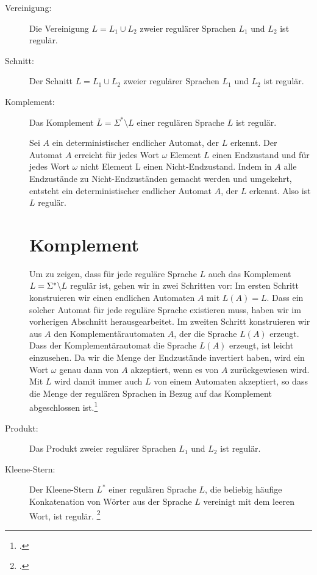 \documentclass{lehramt-informatik-haupt}
\begin{document}
\begin{description}
\item[Vereinigung:]

Die Vereinigung $L = L_1 \cup L_2$ zweier regulärer Sprachen $L_1$ und
$L_2$ ist regulär.

\item[Schnitt:]

Der Schnitt $L = L_1 \cup L_2$ zweier regulärer Sprachen $L_1$ und $L_2$
ist regulär.

\item[Komplement:]

Das Komplement $\bar L = \Sigma^* \setminus L$ einer regulären Sprache
$L$ ist regulär.

Sei $A$ ein deterministischer endlicher Automat, der $L$
erkennt. Der Automat $A$ erreicht für jedes Wort $\omega$ Element $L$
einen Endzustand und für jedes Wort $\omega$ nicht Element L einen
Nicht-Endzustand. Indem in $A$ alle Endzustände zu Nicht-Endzuständen
gemacht werden und umgekehrt, entsteht ein deterministischer endlicher
Automat $A$, der $L$ erkennt. Also ist $L$ regulär.

\section{Komplement}

Um zu zeigen, dass für jede reguläre Sprache $L$ auch das Komplement $L
= \Sigma^* \string\ L$ regulär ist, gehen wir in zwei Schritten vor: Im
ersten Schritt konstruieren wir einen endlichen Automaten $A$ mit $L (A)
= L$. Dass ein solcher Automat für jede reguläre Sprache existieren
muss, haben wir im vorherigen Abschnitt herausgearbeitet. Im zweiten
Schritt konstruieren wir aus $A$ den Komplementärautomaten $A$, der die
Sprache $L (A)$ erzeugt. Dass der Komplementärautomat die Sprache $L
(A)$ erzeugt, ist leicht einzusehen. Da wir die Menge der Endzustände
invertiert haben, wird ein Wort $\omega$ genau dann von $A$ akzeptiert,
wenn es von $A$ zurückgewiesen wird. Mit $L$ wird damit immer auch $L$
von einem Automaten akzeptiert, so dass die Menge der regulären Sprachen
in Bezug auf das Komplement abgeschlossen ist.\footcite[Seite
218-219]{hoffmann}

\item[Produkt:]

Das Produkt  zweier regulärer
Sprachen $L_1$ und $L_2$ ist regulär.

\item[Kleene-Stern:]

Der Kleene-Stern $L^*$ einer regulären Sprache $L$, \dh die beliebig
häufige Konkatenation von Wörter aus der Sprache $L$ vereinigt mit dem
leeren Wort, ist regulär.
\footcite[Seite 68]{theo:fs:1}
\end{description}
\end{document}
